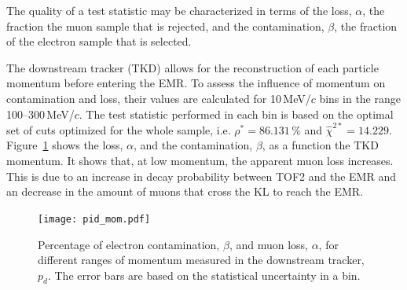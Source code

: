 The quality of a test statistic may be characterized in terms of the loss, $\alpha$, the fraction the muon sample that is rejected, and the contamination, $\beta$, the fraction of the electron sample that is selected.

The downstream tracker (TKD) allows for the reconstruction of each particle momentum before entering the EMR. To assess the influence of momentum on contamination and loss, their values are calculated for 10\,MeV/$c$ bins in the range 100--300\,MeV/$c$. The test statistic performed in each bin is based on the optimal set of cuts optimized for the whole sample, i.e. $\rho^*=86.131$\,\% and $\hat{\chi}^{2*}=14.229$. Figure~\ref{fig:emr_pid_mom} shows the loss, $\alpha$, and the contamination, $\beta$, as a function the TKD momentum. It shows that, at low momentum, the apparent muon loss increases. This is due to an increase in decay probability between TOF2 and the EMR and an decrease in the amount of muons that cross the KL to reach the EMR.

\begin{figure}[htb!]
	\begin{center}
		\texttt{[image: pid\_mom.pdf]}  		
		\caption{Percentage of electron contamination, $\beta$, and muon loss, $\alpha$, for different ranges of momentum measured in the downstream tracker, $p_d$. The error bars are based on the statistical uncertainty in a bin.}
		\label{fig:emr_pid_mom}
	\end{center}
\end{figure}
